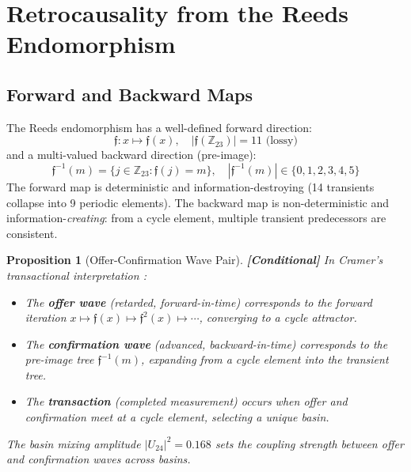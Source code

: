 \documentclass[12pt,a4paper]{article}
\newcommand{\conditional}[1]{\textcolor{conditional}{\textbf{[Conditional]}} #1}
\newtheorem{proposition}[theorem]{Proposition}
\theoremstyle{definition}
\theoremstyle{remark}
\newcommand{\Reeds}{\mathfrak{f}}
\newcommand{\Zp}{\mathbb{Z}_{23}}
\begin{document}
\section{Retrocausality from the Reeds Endomorphism}
\label{sec:reeds_retro}

\subsection{Forward and Backward Maps}

The Reeds endomorphism has a well-defined forward direction:
\begin{equation}
  \Reeds: x \mapsto \Reeds(x), \quad |\Reeds(\Zp)| = 11 \text{ (lossy)}
\end{equation}
and a multi-valued backward direction (pre-image):
\begin{equation}
  \Reeds^{-1}(m) = \{j \in \Zp : \Reeds(j) = m\}, \quad |\Reeds^{-1}(m)| \in \{0, 1, 2, 3, 4, 5\}
\end{equation}
The forward map is deterministic and information-destroying (14 transients
collapse into 9 periodic elements). The backward map is non-deterministic and
information-\emph{creating}: from a cycle element, multiple transient
predecessors are consistent.

\begin{proposition}[Offer-Confirmation Wave Pair]
\label{prop:cramer}
\conditional{In Cramer's transactional interpretation \cite{cramer1986}:}
\begin{itemize}
  \item The \textbf{offer wave} (retarded, forward-in-time) corresponds to the
  forward iteration $x \mapsto \Reeds(x) \mapsto \Reeds^2(x) \mapsto \cdots$,
  converging to a cycle attractor.
  \item The \textbf{confirmation wave} (advanced, backward-in-time) corresponds
  to the pre-image tree $\Reeds^{-1}(m)$, expanding from a cycle element into
  the transient tree.
  \item The \textbf{transaction} (completed measurement) occurs when offer and
  confirmation meet at a cycle element, selecting a unique basin.
\end{itemize}
The basin mixing amplitude $|U_{24}|^2 = 0.168$ sets the coupling strength
between offer and confirmation waves across basins.
\end{proposition}
\end{document}
